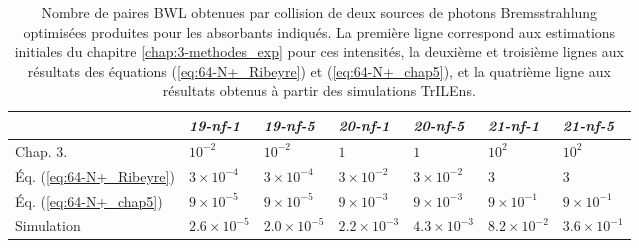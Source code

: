 \begin{refsection}
\begin{table}
\begin{tabular}{ | l | l | l | l | l | l | l |}
    \hline
        & \textit{19-nf-1}             & \textit{19-nf-5}             & \textit{20-nf-1}             & \textit{20-nf-5}             & \textit{21-nf-1}             & \textit{21-nf-5} \\
    \hline
    Chap. 3. & $10^{-2}$             & $10^{-2}$             & $1$                   & $1$                   & $10^{2}$              & $10^{2}$     \\
    Éq. (\ref{eq:64-N+_Ribeyre})             & $3 \times 10^{-4}$    & $3 \times 10^{-4}$    & $3 \times 10^{-2}$    & $3 \times 10^{-2}$    & $3$                   & $3$   \\
    Éq. (\ref{eq:64-N+_chap5})                   & $9 \times 10^{-5}$    & $9 \times 10^{-5}$    & $9 \times 10^{-3}$    & $9 \times 10^{-3}$    & $9 \times 10^{-1}$    & $9 \times 10^{-1}$       \\
    Simulation                       & $2.6 \times 10^{-5}$ & $2.0 \times 10^{-5}$ & $2.2 \times 10^{-3}$ & $4.3 \times 10^{-3}$ & $8.2 \times 10^{-2}$ & $3.6 \times 10^{-1}$ \\
    \hline
    \end{tabular}
    \caption{Nombre de paires BWL obtenues par collision de deux sources de photons Bremsstrahlung optimisées produites pour les absorbants indiqués. La première ligne correspond aux estimations initiales du chapitre \ref{chap:3-methodes_exp} pour ces intensités, la deuxième et troisième lignes aux résultats des équations (\ref{eq:64-N+_Ribeyre}) et (\ref{eq:64-N+_chap5}), et la quatrième ligne aux résultats obtenus à partir des simulations TrILEns.}
	\label{tab:64-paires_BWL}
\end{table}


\end{refsection}
